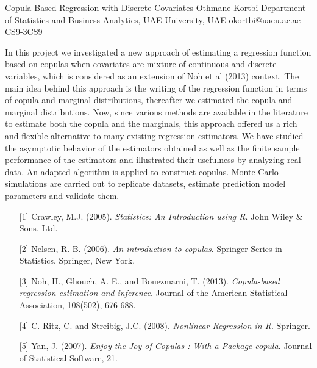 \begin{talk}
  {Copula-Based Regression with Discrete Covariates}%
  {Othmane Kortbi}%
  {Department of Statistics and Business Analytics, UAE University, UAE}%
  {okortbi@uaeu.ac.ae}%
  {} %
{}{}{CS9-3}{CS9}


In this project we investigated a new approach of estimating a regression function
based on copulas when covariates are mixture of continuous and discrete variables,
which is considered as an extension of Noh et al (2013) context. 
The main idea behind this approach is the writing of the regression function in terms of copula and marginal distributions,
thereafter we estimated the copula and marginal distributions. Now, since various 
methods are available in the literature to estimate both the copula and the marginals, this
approach offered us a rich and 
flexible alternative to many existing regression estimators.
We have studied the asymptotic behavior of the estimators obtained as well as the finite
sample performance of the estimators and illustrated their usefulness by analyzing real
data. An adapted algorithm is applied to construct copulas. Monte Carlo simulations are carried out 
to replicate datasets, estimate prediction model parameters and validate them.
 
\medskip


\begin{enumerate}

	
	\item[{[1]}] Crawley, M.J. (2005). {\it Statistics: An Introduction using R}. John Wiley \& Sons, Ltd.
	
	\item[{[2]}]Nelsen, R. B. (2006). {\it An introduction to copulas}. Springer Series in Statistics. Springer, New York.
	
	\item[{[3]}] Noh, H., Ghouch, A. E., and Bouezmarni, T. (2013). {\it Copula-based regression estimation and inference}. Journal of the American Statistical Association, 108(502), 676-688.
	
	\item[{[4]}] C. Ritz, C. and Streibig, J.C. (2008). {\it Nonlinear Regression in R}. Springer.

\item[{[5]}] Yan, J. (2007). {\it Enjoy the Joy of Copulas : With a Package copula}. Journal of Statistical Software, 21.

\end{enumerate}

\end{talk}

